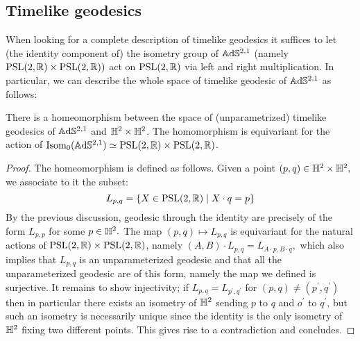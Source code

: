 \subsection{Timelike geodesics}
When looking for a complete description of timelike geodesics it suffices to let (the identity component of) the isometry group of $\mathbb{A}\mathrm{d}\mathbb{S}^{2,1}$ (namely $\text{PSL}(2,\mathbb{R})\times\text{PSL}(2,\mathbb{R}))$ act on $\text{PSL}(2,\mathbb{R})$ via left and right multiplication. In particular, we can describe the whole space of timelike geodesic of $\mathbb{A}\mathrm{d}\mathbb{S}^{2,1}$ as follows: 

\begin{proposition}\label{352}
    There is a homeomorphism between the space of (unparametrized) timelike geodesics of $\mathbb{A}\mathrm{d}\mathbb{S}^{2,1}$ and $\mathbb{H}^2\times\mathbb{H}^2$. The homomorphism is equivariant for the action of $\text{Isom}_{0} (\mathbb{A}\mathrm{d}\mathbb{S}^{2,1})\simeq \text{PSL}(2,\mathbb{R})\times\text{PSL}(2,\mathbb{R})$.
\end{proposition}
\begin{proof}
    The homeomorphism is defined as follows. Given a point $(p,q)\in \mathbb{H}^2\times\mathbb{H}^2,$ we associate to it the subset: 
    \[
        L_{p,q}=\{X\in\text{PSL}(2,\mathbb{R})\;|\;X\cdot q=p\}
    \]
    By the previous discussion, geodesic through the identity are precisely of the form $L_{p,p}$ for some $p\in\mathbb{H}^2.$ The map $(p,q)\mapsto L_{p,q}$ is equivariant for the natural actions of $\text{PSL}(2,\mathbb{R})\times \text{PSL}(2,\mathbb{R})$, namely $(A,B)\cdot L_{p,q}=L_{A\cdot p,B\cdot q},$ which also implies that $L_{p,q}$ is an unparameterized geodesic and that all the unparameterized geodesic are of this form, namely the map we defined is surjective. It remains to show injectivity; if $L_{p,q}=L_{p^{\prime} ,q^{\prime} }$ for $(p,q)\neq(p^{\prime},q^{\prime} )$ then in particular there exists an isometry of $\mathbb{H}^2$ sending $p$ to $q$ and $o^{\prime} $ to $q^{\prime}$, but such an isometry is necessarily unique since the identity is the only isometry of $\mathbb{H}^2$ fixing two different points. This gives rise to a contradiction and concludes.  
\end{proof}

